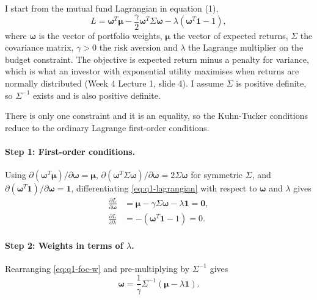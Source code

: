 \documentclass[11pt]{article}
\numberwithin{equation}{section}
\begin{document}
I start from the mutual fund Lagrangian in equation (1),
\begin{equation}
  L = \bm{\omega}^{T}\bm{\mu} - \frac{\gamma}{2}\bm{\omega}^{T}\Sigma\bm{\omega} - \lambda\left(\bm{\omega}^{T}\mathbf{1} - 1\right),
  \label{eq:q1-lagrangian}
\end{equation}
where $\bm{\omega}$ is the vector of portfolio weights, $\bm{\mu}$ the vector of expected returns, $\Sigma$ the covariance matrix, $\gamma > 0$ the risk aversion and $\lambda$ the Lagrange multiplier on the budget constraint. The objective is expected return minus a penalty for variance, which is what an investor with exponential utility maximises when returns are normally distributed (Week 4 Lecture 1, slide 4). I assume $\Sigma$ is positive definite, so $\Sigma^{-1}$ exists and is also positive definite.

There is only one constraint and it is an equality, so the Kuhn-Tucker conditions reduce to the ordinary Lagrange first-order conditions.

\paragraph{Step 1: First-order conditions.}
Using $\partial(\bm{\omega}^{T}\bm{\mu})/\partial\bm{\omega} = \bm{\mu}$, $\partial(\bm{\omega}^{T}\Sigma\bm{\omega})/\partial\bm{\omega} = 2\Sigma\bm{\omega}$ for symmetric $\Sigma$, and $\partial(\bm{\omega}^{T}\mathbf{1})/\partial\bm{\omega} = \mathbf{1}$, differentiating \eqref{eq:q1-lagrangian} with respect to $\bm{\omega}$ and $\lambda$ gives
\begin{align}
  \frac{\partial L}{\partial \bm{\omega}} &= \bm{\mu} - \gamma\Sigma\bm{\omega} - \lambda\mathbf{1} = \mathbf{0}, \label{eq:q1-foc-w}\\
  \frac{\partial L}{\partial \lambda} &= -\left(\bm{\omega}^{T}\mathbf{1} - 1\right) = 0. \label{eq:q1-foc-lambda}
\end{align}

\paragraph{Step 2: Weights in terms of $\lambda$.}
Rearranging \eqref{eq:q1-foc-w} and pre-multiplying by $\Sigma^{-1}$ gives
\begin{equation}
  \bm{\omega} = \frac{1}{\gamma}\Sigma^{-1}\left(\bm{\mu} - \lambda\mathbf{1}\right).
  \label{eq:q1-w-lambda}
\end{equation}
\end{document}
